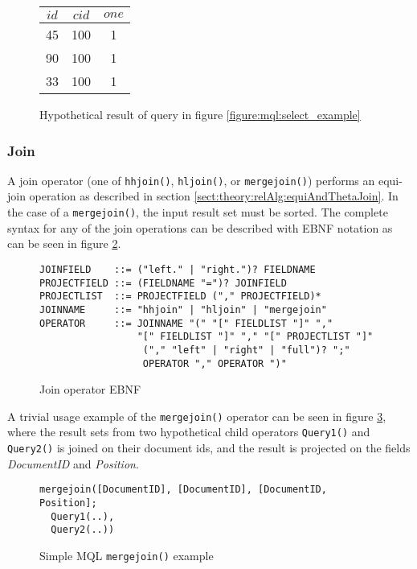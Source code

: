 \begin{figure}[!h]
\centering
\begin{tabular}{|c | c | c |}
\hline
$id$ & $cid$ & $one$ \\ \hline
45 & 100 & 1 \\ \hline
90 & 100 & 1 \\ \hline
33 & 100 & 1 \\ \hline
\end{tabular}
\caption{Hypothetical result of query in figure
\ref{figure:mql:select_example}}
\label{figure:mql:select_example_result}
\end{figure}

\subsubsection{Join}
A join operator (one of \texttt{hhjoin()}, \texttt{hljoin()}, or
\texttt{mergejoin()}) performs an equi-join operation as described in section
\ref{sect:theory:relAlg:equiAndThetaJoin}. In the case of a
\texttt{mergejoin()}, the input result set must be sorted. The complete syntax
for any of the join operations can be described with EBNF notation as can be
seen in figure \ref{figure:mql:ebnf:join}.
\begin{figure}[!h]
\centering
\begin{Verbatim}
JOINFIELD    ::= ("left." | "right.")? FIELDNAME
PROJECTFIELD ::= (FIELDNAME "=")? JOINFIELD
PROJECTLIST  ::= PROJECTFIELD ("," PROJECTFIELD)*
JOINNAME     ::= "hhjoin" | "hljoin" | "mergejoin"
OPERATOR     ::= JOINNAME "(" "[" FIELDLIST "]" "," 
                 "[" FIELDLIST "]" "," "[" PROJECTLIST "]"
                  ("," "left" | "right" | "full")? ";"
                  OPERATOR "," OPERATOR ")"
\end{Verbatim}
\caption{Join operator EBNF}
\label{figure:mql:ebnf:join}
\end{figure}
A trivial usage example of the \texttt{mergejoin()} operator can be seen in
figure \ref{figure:mql:mergejoin_example}, where the result sets from two
hypothetical child operators \texttt{Query1()} and \texttt{Query2()} is joined
on their document ids, and the result is projected on the
fields \textit{DocumentID} and \textit{Position}.

\begin{figure}[!h]
\centering
\begin{Verbatim}
mergejoin([DocumentID], [DocumentID], [DocumentID, Position]; 
  Query1(..),
  Query2(..))
\end{Verbatim}
\caption{Simple MQL \texttt{mergejoin()} example}
\label{figure:mql:mergejoin_example}
\end{figure}


